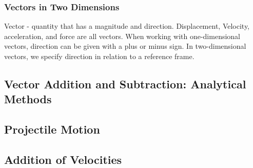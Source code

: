 \documentclass{article}
\begin{document}
\subsubsection{Vectors in Two Dimensions}
Vector - quantity that has a magnitude and direction.
Displacement, Velocity, acceleration, and force are all vectors.
When working with one-dimensional vectors, direction can be given with a plus or minus sign.
In two-dimensional vectors, we specify direction in relation to a reference frame.

\subsection{Vector Addition and Subtraction: Analytical Methods}
\subsection{Projectile Motion}
\subsection{Addition of Velocities}
\end{document}
